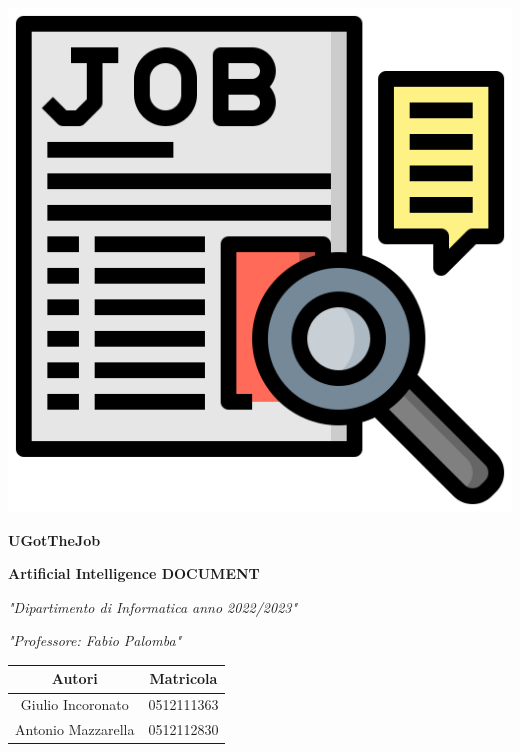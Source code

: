 \documentclass{article}
\author{Giulio Incoronato, Antonio Mazzarella}
\newcommand{\mainname}{UGotTheJob}
\begin{document}
\thispagestyle{empty}

\begin{center}%
    \includegraphics[scale=0.6]{job_seeking.png}

    \vspace{1cm}

    \textbf{\huge{\mainname}} %

    \vspace{0.5cm}

    \fontsize{17}{16}
    \textbf{Artificial Intelligence DOCUMENT}

    \textit{"Dipartimento di Informatica anno 2022/2023"}

    \textit{"Professore: Fabio Palomba"}

    \vspace{1.8cm}


    \begin{table}[ht]
        \fontsize{17}{12}\selectfont
        \centering
        \setlength{\arrayrulewidth}{2pt}
        \setlength{\tabcolsep}{5pt}
        \def\arraystretch{1.8}
        \begin{tabular}{ c | c }
            \textbf{Autori}    & \textbf{Matricola} \\
            \hline
            Giulio Incoronato  & 0512111363         \\
            Antonio Mazzarella & 0512112830         \\
        \end{tabular}
    \end{table}
\end{center}
\end{document}
